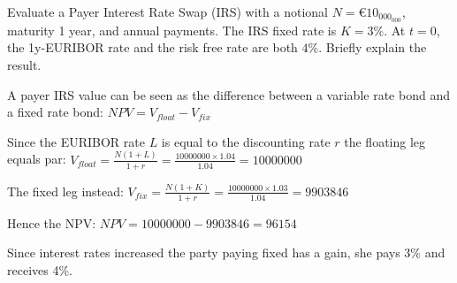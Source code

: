\documentclass[12pt,a4paper]{exam}
\begin{document}
\begin{questions}

\question 
Evaluate a Payer Interest Rate Swap (IRS) with a notional $N = € 10_000_000$, maturity 1 year, and annual payments. The IRS fixed rate is $K = 3\%$.
At $t=0$, the 1y-EURIBOR rate and the risk free rate are both $4\%$. Briefly explain the result.
\makeemptybox{10cm}

\begin{solution}
A payer IRS value can be seen as the difference between a variable rate bond and a fixed rate bond:
$NPV = V_{float} - V_{fix}$

Since the EURIBOR rate $L$ is equal to the discounting rate $r$ the floating leg equals par:
$V_{float} = \frac{N(1 + L)}{1 + r} = \frac{10000000 \times 1.04}{1.04} = 10000000$

The fixed leg instead:
$V_{fix} = \frac{N(1 + K)}{1 + r} = \frac{10000000 \times 1.03}{1.04} = 9903846$

Hence the NPV:
$NPV = 10000000 - 9903846 = 96154$

Since interest rates increased the party paying fixed has a gain, she pays 3\% and receives 4\%.
\end{solution}




\end{questions}
\end{document}
